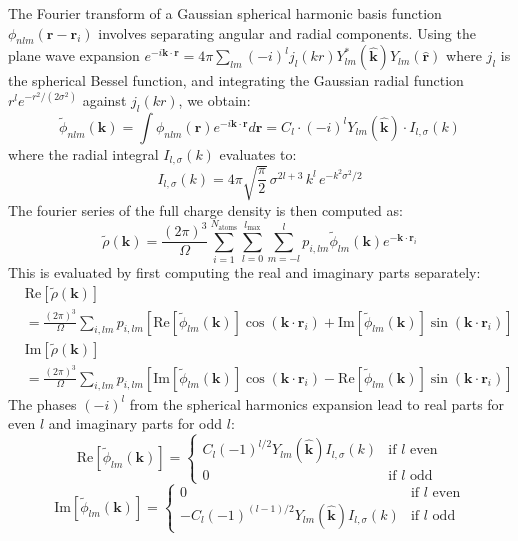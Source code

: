 \documentclass[aps,%
superscriptaddress,
 amsmath,amssymb,
floatfix,
twocolumn
]{revtex4-2}
\begin{document}
The Fourier transform of a Gaussian spherical harmonic basis function $\phi_{nlm}(\mathbf{r} - \mathbf{r}_i)$ involves separating angular and radial components. Using the plane wave expansion $e^{-i\mathbf{k}\cdot\mathbf{r}} = 4\pi \sum_{lm} (-i)^l j_l(kr) Y_{lm}^*(\hat{\mathbf{k}}) Y_{lm}(\hat{\mathbf{r}})$ where $j_l$ is the spherical Bessel function, and integrating the Gaussian radial function $r^l e^{-r^2/(2\sigma^2)}$ against $j_l(kr)$, we obtain:
\begin{equation}
\tilde{\phi}_{nlm}(\mathbf{k}) = \int \phi_{nlm}(\mathbf{r}) e^{-i\mathbf{k}\cdot\mathbf{r}} d\mathbf{r} = C_l \cdot (-i)^l Y_{lm}(\hat{\mathbf{k}}) \cdot I_{l,\sigma}(k)
\end{equation}
where the radial integral $I_{l,\sigma}(k)$ evaluates to:
\begin{equation}
I_{l,\sigma}(k) = 4\pi \sqrt{\frac{\pi}{2}} \, \sigma^{2l+3} \, k^l \, e^{-k^2\sigma^2/2}
\end{equation}
The fourier series of the full charge density is then computed as:
\begin{equation}
\tilde{\rho}(\mathbf{k}) = \frac{(2\pi)^3}{\Omega} \sum_{i=1}^{N_{\text{atoms}}} \sum_{l=0}^{l_{\text{max}}} \sum_{m=-l}^{l} p_{i,lm} \tilde{\phi}_{lm}(\mathbf{k})e^{-\mathbf{k}\cdot \mathbf{r}_i}
\end{equation}
This is evaluated by first computing the real and imaginary parts separately:
\begin{align}
&\text{Re}[\tilde{\rho}(\mathbf{k})] \\
&= \frac{(2\pi)^3}{\Omega} \sum_{i,lm} p_{i,lm} [\text{Re}[\tilde{\phi}_{lm}(\mathbf{k})] \cos(\mathbf{k}\cdot\mathbf{r}_i) + \text{Im}[\tilde{\phi}_{lm}(\mathbf{k})] \sin(\mathbf{k}\cdot\mathbf{r}_i)] \\
&\text{Im}[\tilde{\rho}(\mathbf{k})] \\
&= \frac{(2\pi)^3}{\Omega} \sum_{i,lm} p_{i,lm} [\text{Im}[\tilde{\phi}_{lm}(\mathbf{k})] \cos(\mathbf{k}\cdot\mathbf{r}_i) - \text{Re}[\tilde{\phi}_{lm}(\mathbf{k})] \sin(\mathbf{k}\cdot\mathbf{r}_i)]
\end{align}
The phases $(-i)^l$ from the spherical harmonics expansion lead to real parts for even $l$ and imaginary parts for odd $l$:
\begin{equation}
\text{Re}[\tilde{\phi}_{lm}(\mathbf{k})] = \begin{cases}
C_l (-1)^{l/2} Y_{lm}(\hat{\mathbf{k}}) I_{l,\sigma}(k) & \text{if } l \text{ even} \\
0 & \text{if } l \text{ odd}
\end{cases}
\end{equation}
\begin{equation}
\text{Im}[\tilde{\phi}_{lm}(\mathbf{k})] = \begin{cases}
0 & \text{if } l \text{ even} \\
-C_l (-1)^{(l-1)/2} Y_{lm}(\hat{\mathbf{k}}) I_{l,\sigma}(k) & \text{if } l \text{ odd}
\end{cases}
\end{equation}
\end{document}
